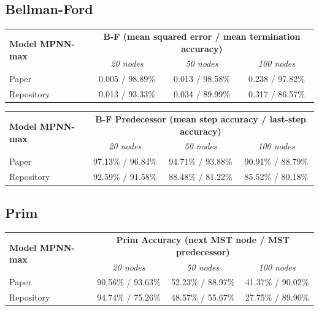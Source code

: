 \documentclass[11pt, a4paper]{article}
\begin{document}
\subsection{Bellman-Ford}

\begin{table}[H]
\centering
\begin{tabular}{lccc}
\toprule
\multirow{2}{*}{\textbf{Model MPNN-max}} &
\multicolumn{3}{c}{\textbf{B-F (mean squared error / mean termination accuracy)}} \\
& \textit{20 nodes} & \textit{50 nodes} & \textit{100 nodes} \\
\midrule
Paper
& 0.005 / 98.89\%
& 0.013 / 98.58\%
& 0.238 / 97.82\% \\
\midrule
Repository
& 0.013 / 93.33\%
& 0.034 / 89.99\%
& 0.317 / 86.57\% \\
\bottomrule
\end{tabular}
\end{table}

\begin{table}[H]
\centering
\begin{tabular}{lccc}
\toprule
\multirow{2}{*}{\textbf{Model MPNN-max}} &
\multicolumn{3}{c}{\textbf{B-F Predecessor (mean step accuracy / last-step accuracy)}} \\
& \textit{20 nodes} & \textit{50 nodes} & \textit{100 nodes} \\
\midrule
Paper
& 97.13\% / 96.84\%
& 94.71\% / 93.88\%
& 90.91\% / 88.79\% \\
\midrule
Repository
& 92.59\% / 91.58\%
& 88.48\% / 81.22\%
& 85.52\% / 80.18\% \\
\bottomrule
\end{tabular}
\end{table}

\subsection{Prim}

\begin{table}[H]
\centering
\begin{tabular}{lccc}
\toprule
\multirow{2}{*}{\textbf{Model MPNN-max}} &
\multicolumn{3}{c}{\textbf{Prim Accuracy (next MST node / MST predecessor)}} \\
& \textit{20 nodes} & \textit{50 nodes} & \textit{100 nodes} \\
\midrule
Paper
& 90.56\% / 93.63\%
& 52.23\% / 88.97\%
& 41.37\% / 90.02\% \\
\midrule
Repository
& 94.74\% / 75.26\%
& 48.57\% / 55.67\%
& 27.75\% / 89.90\% \\
\bottomrule
\end{tabular}
\end{table}
\end{document}
